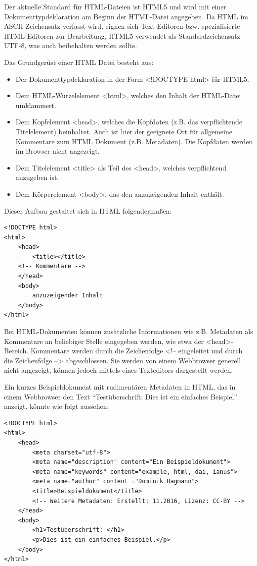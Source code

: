 Der aktuelle Standard für HTML-Dateien ist HTML5 und wird mit einer Dokumenttypdeklaration am Beginn der HTML-Datei angegeben. Da HTML im ASCII-Zeichensatz verfasst wird, eignen sich Text-Editoren bzw. spezialisierte HTML-Editoren zur Bearbeitung. HTML5 verwendet als Standardzeichensatz UTF-8, was auch beibehalten werden sollte.

Das Grundgerüst einer HTML Datei besteht aus:
\begin{itemize}
	\item Der Dokumenttypdeklaration in der Form <!DOCTYPE html> für HTML5.
	\item Dem HTML-Wurzelelement <html>, welches den Inhalt der HTML-Datei umklammert. 
	\item Dem Kopfelement <head>, welches die Kopfdaten (z.B. das verpflichtende Titelelement) beinhaltet. Auch ist hier der geeignete Ort für allgemeine Kommentare zum HTML Dokument (z.B. Metadaten). Die Kopfdaten werden im Browser nicht angezeigt. 
	\item Dem Titelelement <title> als Teil des <head>, welches verpflichtend anzugeben ist. 
	\item Dem Körperelement <body>, das den anzuzeigenden Inhalt enthält. 
\end{itemize}

Dieser Aufbau gestaltet sich in HTML folgendermaßen: 

\lstset{language=HTML}
\begin{lstlisting}[frame=L, xleftmargin=1.5\parindent, rulecolor=\color{ianusGrau}]
<!DOCTYPE html>
<html>
	<head>
		<title></title>
    <!-- Kommentare -->
	</head>
	<body>
		anzuzeigender Inhalt
	</body>
</html>
\end{lstlisting}



Bei HTML-Dokumenten können zusätzliche Informationen wie z.B. Metadaten als Kommentare an beliebiger Stelle eingegeben werden, wie etwa der <head>-Bereich. Kommentare werden durch die Zeichenfolge <!-- eingeleitet und durch die Zeichenfolge --> abgeschlossen. Sie werden von einem Webbrowser generell nicht angezeigt, können jedoch mittels eines Texteditors dargestellt werden.

Ein kurzes Beispieldokument mit rudimentären Metadaten in HTML, das in einem Webbrowser den Text "`Testüberschrift: Dies ist ein einfaches Beispiel"' anzeigt, könnte wie folgt aussehen: 
\lstset{language=HTML}
\begin{lstlisting}[frame=L, xleftmargin=1.5\parindent, rulecolor=\color{ianusGrau}]
<!DOCTYPE html>
<html>
	<head>
		<meta charset="utf-8">
		<meta name="description" content="Ein Beispieldokument">
		<meta name="keywords" content="example, html, dai, ianus">
		<meta name="author" content ="Dominik Hagmann">
		<title>Beispieldokument</title>
		<!-- Weitere Metadaten: Erstellt: 11.2016, Lizenz: CC-BY -->
	</head>
	<body>
		<h1>Testüberschrift: </h1>
		<p>Dies ist ein einfaches Beispiel.</p>
	</body>
</html>
\end{lstlisting}


